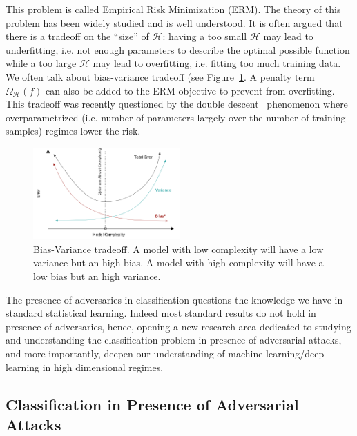 This problem is called Empirical Risk Minimization (ERM). The theory of this problem has been widely studied and is well understood. It is often argued that there is a tradeoff on the ``size'' of $\mathcal{H}$: having a too small $\mathcal{H}$ may lead to underfitting, i.e. not enough parameters to describe the optimal possible function while a too large $\mathcal{H}$ may lead to overfitting, i.e. fitting too much training data. We often talk about bias-variance tradeoff (see Figure~\ref{fig:tradeoff_bias_accuracy}. A penalty term $\Omega_{\mathcal{H}}(f)$ can also be added to the ERM objective to prevent from overfitting. This tradeoff was recently questioned by the double descent~\citep{belkin2019reconciling} phenomenon where overparametrized (i.e. number of parameters largely over the number of training samples) regimes lower the risk.
\begin{figure}
    \centering
    \includegraphics[width=0.5\textwidth]{Images/tradeoff_bias_variance.png}
    \caption{Bias-Variance tradeoff. A model with low complexity will have a low variance but an high bias. A model with high complexity will have a low bias but an high variance.}
    \label{fig:tradeoff_bias_accuracy}
\end{figure}
\begin{tcolorbox}
The presence of adversaries in classification questions the knowledge we have in standard statistical learning. Indeed most standard results do not hold in presence of adversaries, hence, opening a new research area dedicated to studying and understanding the classification problem in presence of adversarial attacks, and more importantly, deepen our understanding of  machine learning/deep learning in high dimensional regimes.
\end{tcolorbox}


\subsection{Classification in Presence of Adversarial Attacks}

